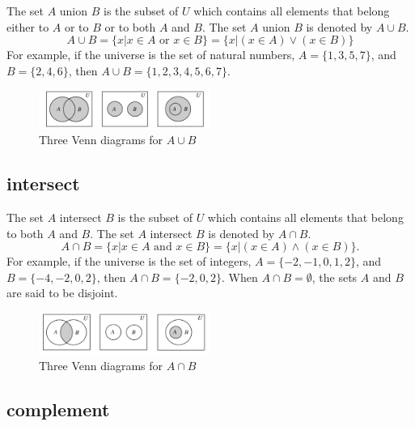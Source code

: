 \documentclass{article}
\begin{document}
    The set $A$ union $B$ is the subset of $U$ which contains all elements that belong either to $A$ or to $B$ or to both $A$ and $B$. The set $A$ union $B$ is denoted by $A \cup B$.
    \begin{equation}
    A \cup B = \{x | x \in A \textrm{ or } x \in B \} = \{x | (x \in A) \vee (x \in B)\}
    \end{equation}
    For example, if the universe is the set of natural numbers, $A = \{1,3,5,7\}$, and $B = \{2,4,6\}$, then $A \cup B = \{1,2,3,4,5,6,7\}$.
    \begin{figure}[h]
    \centering
    \includegraphics[width=0.5\textwidth]{./images/set-theory-1}
    \caption{Three Venn diagrams for $A \cup B$}
    \end{figure}

    \subsection{intersect}

    The set $A$ intersect $B$ is the subset of $U$ which contains all elements that belong to both $A$ and $B$. The set $A$ intersect $B$ is denoted by $A \cap B$.
    \begin{equation}
    A \cap B = \{x | x \in A \textrm{ and } x \in B\} = \{x|(x \in A) \wedge (x \in B)\}.
    \end{equation}
    For example, if the universe is the set of integers, $A = \{-2,-1,0,1,2\}$, and $B = \{-4,-2,0,2\}$, then $A \cap B = \{-2,0,2\}$. When $A \cap B = \emptyset$, the sets $A$ and $B$ are said to be disjoint.
    \begin{figure}[h]
    \centering
    \includegraphics[width=0.5\textwidth]{./images/set-theory-2}
    \caption{Three Venn diagrams for $A \cap B$}
    \end{figure}
    
    \subsection{complement}
\end{document}
